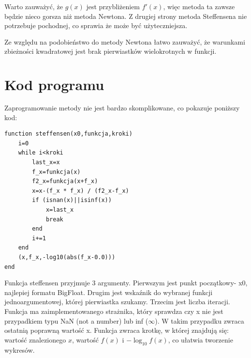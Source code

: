 \documentclass{article}
\begin{document}
Warto zauważyć, że $g(x)$ jest przybliżeniem $f'(x)$, więc metoda ta zawsze będzie nieco gorsza niż metoda Newtona. Z drugiej strony metoda Steffensena nie potrzebuje pochodnej, co sprawia że może być użyteczniejsza.

Ze względu na podobieństwo do metody Newtona łatwo zauważyć, że warunkami zbieżności kwadratowej jest brak pierwiastków wielokrotnych w funkcji.
\section{Kod programu}
Zaprogramowanie metody nie jest bardzo skomplikowane, co pokazuje poniższy kod:
\begin{lstlisting}
function steffensen(x0,funkcja,kroki)
    i=0
    while i<kroki
      	last_x=x
        f_x=funkcja(x)
        f2_x=funkcja(x+f_x)
        x=x-(f_x * f_x) / (f2_x-f_x)
        if (isnan(x)||isinf(x))
            x=last_x
            break
        end
        i+=1       
    end
    (x,f_x,-log10(abs(f_x-0.0)))
end
\end{lstlisting}

Funkcja steffensen przyjmuje 3 argumenty. Pierwszym jest punkt początkowy- x0, najlepiej formatu BigFloat. Drugim jest wskaźnik do wybranej funkcji jednoargumentowej, której pierwiastka szukamy. Trzecim jest liczba iteracji. Funkcja ma zaimplementowanego strażnika, który sprawdza czy x nie jest przypadkiem typu NaN (not a number) lub inf ($\infty$). W takim przypadku zwraca ostatnią poprawną wartość x. Funkcja zwraca krotkę, w której znajdują się: wartość znalezionego $x$, wartość $f(x)$ i $-\log_{10}{f(x)}$, co ułatwia tworzenie wykresów.
\end{document}
